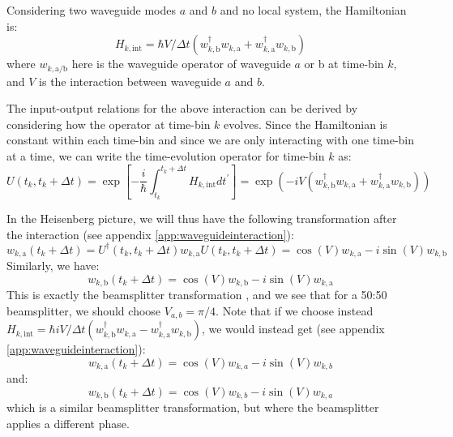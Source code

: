 Considering two waveguide modes $a$ and $b$ and no local system, the Hamiltonian is:
\begin{equation}
    H_{k,\mathrm{int}} = \hbar V/\Delta t (w_{k,\mathrm{b}}^\dagger w_{k,\mathrm{a}} + w_{k,\mathrm{a}}^\dagger w_{k,\mathrm{b}})
    \label{eq:waveguideinteraction}
\end{equation}
where $w_{k, \mathrm{a} / \mathrm{b}}$ here is the waveguide operator of waveguide $a$ or b at time-bin $k$, and $V$ is the interaction between waveguide $a$ and $b$. 

The input-output relations for the above interaction can be derived by considering how the operator at time-bin $k$ evolves. Since the Hamiltonian is constant within each time-bin and since we are only interacting with one time-bin at a time, we can write the time-evolution operator for time-bin $k$ as:
\begin{equation}
    U(t_k,t_k+\Delta t) =\exp \left[-\frac{i}{\hbar} \int_{t_k}^{t_k+\Delta t} H_{k,\mathrm{int}} d t^{\prime}\right] = \exp(- i V(w_{k,\mathrm{b}}^\dagger w_{k,\mathrm{a}} + w_{k,\mathrm{a}}^\dagger w_{k,\mathrm{b}} ))
\end{equation}

In the Heisenberg picture, we will thus have the following transformation after the interaction (see appendix \ref{app:waveguideinteraction}):
\begin{equation}
w_{k,\mathrm{a}}(t_k + \Delta t) = U^\dagger(t_k,t_k+\Delta t) w_{k,\mathrm{a}} U(t_k,t_k+\Delta t) = \cos(V) w_{k,\mathrm{a}} - i \sin(V) w_{k,\mathrm{b}}
\end{equation}
Similarly, we have:
\begin{equation}
w_{k,\mathrm{b}}(t_k + \Delta t) = \cos(V) w_{k,\mathrm{b}} - i \sin(V) w_{k,\mathrm{a}}
\end{equation}
This is exactly the beamsplitter transformation \cite{Gerry2004IntroductoryOptics}, and we see that for a 50:50 beamsplitter, we should choose $V_{a,b} = \pi/4$. Note that if we choose instead $H_{k,\mathrm{int}} = \hbar i V/\Delta t (w_{k,\mathrm{b}}^\dagger w_{k,\mathrm{a}} - w_{k,\mathrm{a}}^\dagger w_{k,\mathrm{b}})$, we would instead get (see appendix \ref{app:waveguideinteraction}):
\begin{equation}
w_{k,\mathrm{a}}(t_k + \Delta t) = \cos(V) w_{k,a} - i \sin(V) w_{k,b}
\end{equation}
and:
\begin{equation}
w_{k,\mathrm{b}}(t_k + \Delta t) = \cos(V) w_{k,b} - i \sin(V) w_{k,a}
\end{equation}
which is a similar beamsplitter transformation, but where the beamsplitter applies a different phase. 
\

